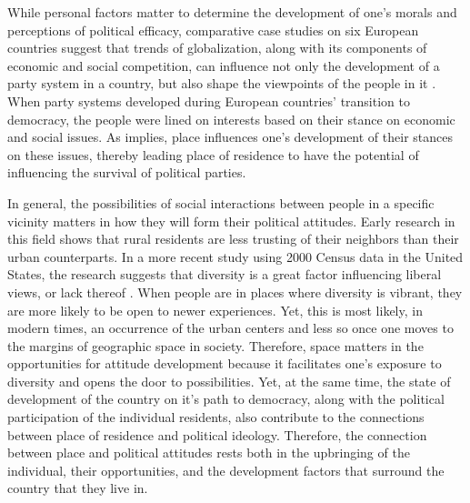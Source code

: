 \documentclass[12pt, titlepage]{article}
\begin{document}
While personal factors matter to determine the development of one's morals and perceptions of political efficacy, comparative case studies on six European countries suggest that trends of globalization, along with its components of economic and social competition, can influence not only the development of a party system in a country, but also shape the viewpoints of the people in it \citep{kriesi_globalization_2006}. When party systems developed during European countries' transition to democracy, the people were lined on interests based on their stance on economic and social issues. As \cite{walsh_putting_2012} implies, place influences one's development of their stances on these issues, thereby leading place of residence to have the potential of influencing the survival of political parties.

In general, the possibilities of social interactions between people in a specific vicinity matters in how they will form their political attitudes. Early research in this field \citep{glenn_rural-urban_1967} shows that rural residents are less trusting of their neighbors than their urban counterparts.  In a more recent study using 2000 Census data in the United States, the research suggests that diversity is a great factor influencing liberal views, or lack thereof \citep{williamson_sprawl_2008}. When people are in places where diversity is vibrant, they are more likely to be open to newer experiences. Yet, this is most likely, in modern times, an occurrence of the urban centers and less so once one moves to the margins of geographic space in society. Therefore, space matters in the opportunities for attitude development because it facilitates one's exposure to diversity and opens the door to possibilities. Yet, at the same time, the state of development of the country on it's path to democracy, along with the political participation of the individual residents, also contribute to the connections between place of residence and political ideology. Therefore, the connection between place and political attitudes rests both in the upbringing of the individual, their opportunities, and the development factors that surround the country that they live in.


\end{document}
